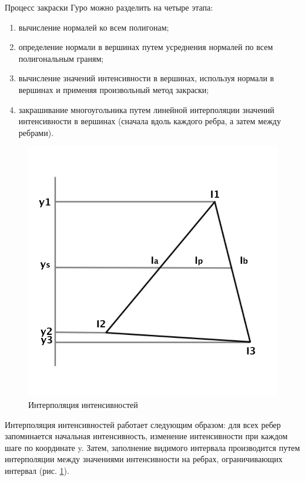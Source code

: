 \vspace{0.3cm}Процесс закраски Гуро можно разделить на четыре этапа:
\begin{enumerate}
	\item вычисление нормалей ко всем полигонам;
	\item определение нормали в вершинах путем усреднения нормалей по всем полигональным граням;
	\item вычисление значений интенсивности в вершинах, используя нормали в вершинах и применяя произвольный метод закраски;
	\item закрашивание многоугольника путем линейной интерполяции значений интенсивности в вершинах (сначала вдоль каждого ребра, а затем между ребрами).
\end{enumerate}


\begin{figure}[ht!]
	\centering
	\includegraphics[scale=0.45]{guro}
	\caption{Интерполяция интенсивностей}
	\label{fig:guro}
\end{figure}

\newpage

\vspace{0.3cm}Интерполяция интенсивностей работает следующим образом: для всех ребер запоминается начальная интенсивность, изменение интенсивности при каждом шаге по координате y. Затем, заполнение видимого интервала производится путем интерполяции между значениями интенсивности на ребрах, ограничивающих интервал (рис. \ref{fig:guro}).

